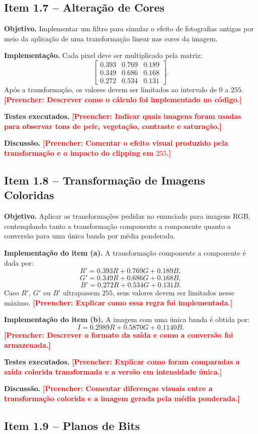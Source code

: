 \documentclass[12pt,a4paper]{article}
\newcommand{\placeholder}[1]{\textcolor{red}{\textbf{[Preencher: #1]}}}
\newcommand{\campo}[2]{\textbf{#1.} #2\par}
\begin{document}
\subsection{Item 1.7 -- Alteração de Cores}

\campo{Objetivo}{Implementar um filtro para simular o efeito de fotografias antigas por meio da aplicação de uma transformação linear nas cores da imagem.}
\campo{Implementação}{Cada pixel deve ser multiplicado pela matriz:
\[
  \begin{bmatrix}
    0.393 & 0.769 & 0.189\\
    0.349 & 0.686 & 0.168\\
    0.272 & 0.534 & 0.131
  \end{bmatrix}.
\]
Após a transformação, os valores devem ser limitados ao intervalo de $0$ a $255$. \placeholder{Descrever como o cálculo foi implementado no código.}}
\campo{Testes executados}{\placeholder{Indicar quais imagens foram usadas para observar tons de pele, vegetação, contraste e saturação.}}
\campo{Discussão}{\placeholder{Comentar o efeito visual produzido pela transformação e o impacto do clipping em $255$.}}

\subsection{Item 1.8 -- Transformação de Imagens Coloridas}

\campo{Objetivo}{Aplicar as transformações pedidas no enunciado para imagens RGB, contemplando tanto a transformação componente a componente quanto a conversão para uma única banda por média ponderada.}
\campo{Implementação do item (a)}{A transformação componente a componente é dada por:
\[
  R' = 0.393R + 0.769G + 0.189B,
\]
\[
  G' = 0.349R + 0.686G + 0.168B,
\]
\[
  B' = 0.272R + 0.534G + 0.131B.
\]
Caso $R'$, $G'$ ou $B'$ ultrapassem $255$, seus valores devem ser limitados nesse máximo. \placeholder{Explicar como essa regra foi implementada.}}
\campo{Implementação do item (b)}{A imagem com uma única banda é obtida por:
\[
  I = 0.2989R + 0.5870G + 0.1140B.
\]
\placeholder{Descrever o formato da saída e como a conversão foi armazenada.}}
\campo{Testes executados}{\placeholder{Explicar como foram comparadas a saída colorida transformada e a versão em intensidade única.}}
\campo{Discussão}{\placeholder{Comentar diferenças visuais entre a transformação colorida e a imagem gerada pela média ponderada.}}

\subsection{Item 1.9 -- Planos de Bits}
\end{document}
